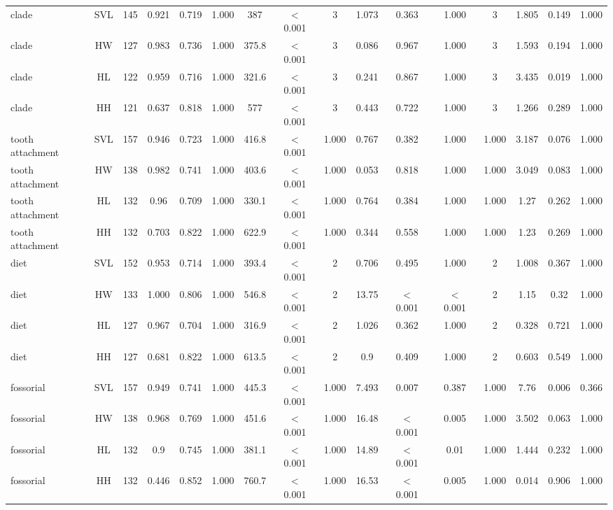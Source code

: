 \begin{longtable}{lccccccccccccccc}
\hline
clade & SVL & 145 & 0.921 & 0.719 & 1.000 & 387 & $<$ 0.001 & 3 & 1.073 & 0.363 & 1.000 & 3 & 1.805 & 0.149 & 1.000 \\ 
clade & HW & 127 & 0.983 & 0.736 & 1.000 & 375.8 & $<$ 0.001 & 3 & 0.086 & 0.967 & 1.000 & 3 & 1.593 & 0.194 & 1.000 \\ 
clade & HL & 122 & 0.959 & 0.716 & 1.000 & 321.6 & $<$ 0.001 & 3 & 0.241 & 0.867 & 1.000 & 3 & 3.435 & 0.019 & 1.000 \\ 
clade & HH & 121 & 0.637 & 0.818 & 1.000 & 577 & $<$ 0.001 & 3 & 0.443 & 0.722 & 1.000 & 3 & 1.266 & 0.289 & 1.000 \\ 
tooth attachment & SVL & 157 & 0.946 & 0.723 & 1.000 & 416.8 & $<$ 0.001 & 1.000 & 0.767 & 0.382 & 1.000 & 1.000 & 3.187 & 0.076 & 1.000 \\ 
tooth attachment & HW & 138 & 0.982 & 0.741 & 1.000 & 403.6 & $<$ 0.001 & 1.000 & 0.053 & 0.818 & 1.000 & 1.000 & 3.049 & 0.083 & 1.000 \\ 
tooth attachment & HL & 132 & 0.96 & 0.709 & 1.000 & 330.1 & $<$ 0.001 & 1.000 & 0.764 & 0.384 & 1.000 & 1.000 & 1.27 & 0.262 & 1.000 \\ 
tooth attachment & HH & 132 & 0.703 & 0.822 & 1.000 & 622.9 & $<$ 0.001 & 1.000 & 0.344 & 0.558 & 1.000 & 1.000 & 1.23 & 0.269 & 1.000 \\ 
diet & SVL & 152 & 0.953 & 0.714 & 1.000 & 393.4 & $<$ 0.001 & 2 & 0.706 & 0.495 & 1.000 & 2 & 1.008 & 0.367 & 1.000 \\ 
diet & HW & 133 & 1.000 & 0.806 & 1.000 & 546.8 & $<$ 0.001 & 2 & 13.75 & $<$ 0.001 & $<$ 0.001 & 2 & 1.15 & 0.32 & 1.000 \\ 
diet & HL & 127 & 0.967 & 0.704 & 1.000 & 316.9 & $<$ 0.001 & 2 & 1.026 & 0.362 & 1.000 & 2 & 0.328 & 0.721 & 1.000 \\ 
diet & HH & 127 & 0.681 & 0.822 & 1.000 & 613.5 & $<$ 0.001 & 2 & 0.9 & 0.409 & 1.000 & 2 & 0.603 & 0.549 & 1.000 \\ 
fossorial & SVL & 157 & 0.949 & 0.741 & 1.000 & 445.3 & $<$ 0.001 & 1.000 & 7.493 & 0.007 & 0.387 & 1.000 & 7.76 & 0.006 & 0.366 \\ 
fossorial & HW & 138 & 0.968 & 0.769 & 1.000 & 451.6 & $<$ 0.001 & 1.000 & 16.48 & $<$ 0.001 & 0.005 & 1.000 & 3.502 & 0.063 & 1.000 \\ 
fossorial & HL & 132 & 0.9 & 0.745 & 1.000 & 381.1 & $<$ 0.001 & 1.000 & 14.89 & $<$ 0.001 & 0.01 & 1.000 & 1.444 & 0.232 & 1.000 \\ 
fossorial & HH & 132 & 0.446 & 0.852 & 1.000 & 760.7 & $<$ 0.001 & 1.000 & 16.53 & $<$ 0.001 & 0.005 & 1.000 & 0.014 & 0.906 & 1.000 \\ 

\end{longtable}

